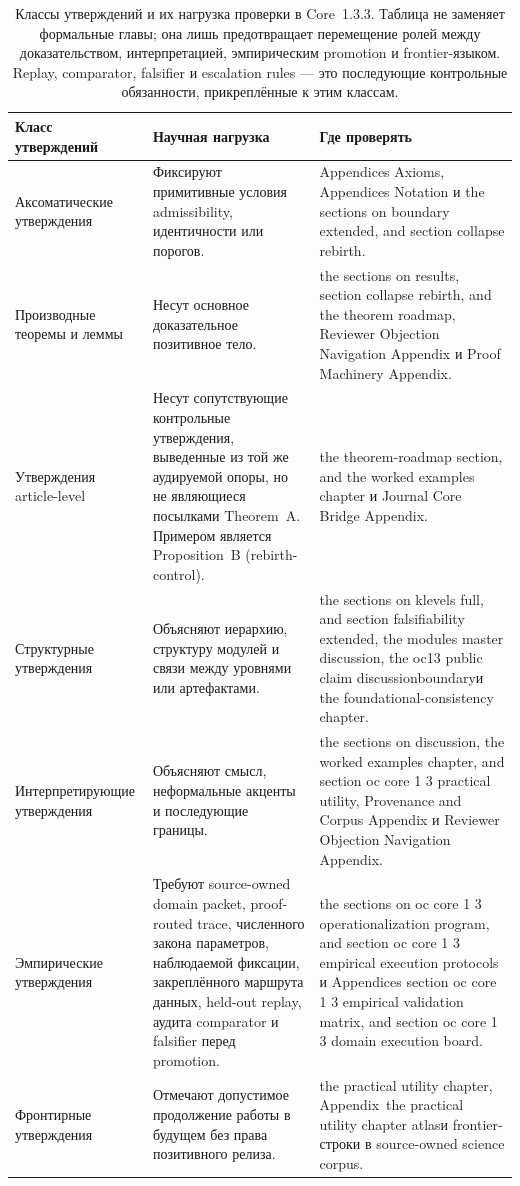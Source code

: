 \begin{table}[htbp]
\centering
\begingroup
\footnotesize
\RaggedRight
\setlength{\tabcolsep}{4pt}
\begin{tabular}{@{}L{0.21\textwidth}L{0.28\textwidth}L{0.39\textwidth}@{}}
\toprule
\textbf{Класс утверждений} & \textbf{Научная нагрузка} & \textbf{Где проверять} \\
\midrule
Аксоматические утверждения & Фиксируют примитивные условия admissibility, идентичности или порогов. & Appendices Axioms, Appendices Notation и the sections on boundary extended, and section collapse rebirth. \\
Производные теоремы и леммы & Несут основное доказательное позитивное тело. & the sections on results, section collapse rebirth, and the theorem roadmap, Reviewer Objection Navigation Appendix и Proof Machinery Appendix. \\
Утверждения article-level & Несут сопутствующие контрольные утверждения, выведенные из той же аудируемой опоры, но не являющиеся посылками Theorem~A. Примером является Proposition~B (rebirth-control). & the theorem-roadmap section, and the worked examples chapter и Journal Core Bridge Appendix. \\
Структурные утверждения & Объясняют иерархию, структуру модулей и связи между уровнями или артефактами. & the sections on klevels full, and section falsifiability extended, the modules master discussion, the oc13 public claim discussionboundaryи the foundational-consistency chapter. \\
Интерпретирующие утверждения & Объясняют смысл, неформальные акценты и последующие границы. & the sections on discussion, the worked examples chapter, and section oc core 1 3 practical utility, Provenance and Corpus Appendix и Reviewer Objection Navigation Appendix. \\
Эмпирические утверждения & Требуют source-owned domain packet, proof-routed trace, численного закона параметров, наблюдаемой фиксации, закреплённого маршрута данных, held-out replay, аудита comparator и falsifier перед promotion. & the sections on oc core 1 3 operationalization program, and section oc core 1 3 empirical execution protocols и Appendices section oc core 1 3 empirical validation matrix, and section oc core 1 3 domain execution board. \\
Фронтирные утверждения & Отмечают допустимое продолжение работы в будущем без права позитивного релиза. & the practical utility chapter, Appendix~the practical utility chapter atlasи frontier-строки в source-owned science corpus. \\
\bottomrule
\end{tabular}
\endgroup
\caption{Классы утверждений и их нагрузка проверки в Core~1.3.3. Таблица не заменяет формальные главы; она лишь предотвращает перемещение ролей между доказательством, интерпретацией, эмпирическим promotion и frontier-языком. Replay, comparator, falsifier и escalation rules — это последующие контрольные обязанности, прикреплённые к этим классам.}
\label{tab:oc13-statement-classes}
\end{table}

